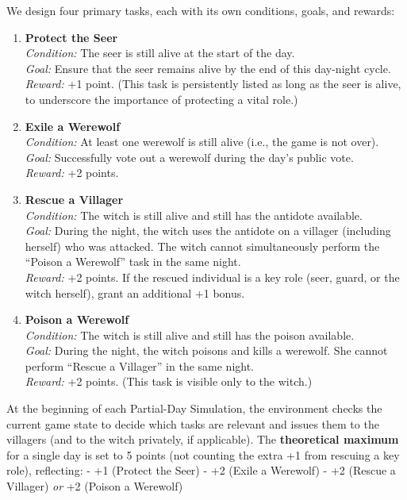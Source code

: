 We design four primary tasks, each with its own conditions, goals, and rewards:

\begin{enumerate}
    \item \textbf{Protect the Seer}\\
    \textit{Condition:} The seer is still alive at the start of the day.\\
    \textit{Goal:} Ensure that the seer remains alive by the end of this day-night cycle.\\
    \textit{Reward:} +1 point. (This task is persistently listed as long as the seer is alive, to underscore the importance of protecting a vital role.)

    \item \textbf{Exile a Werewolf}\\
    \textit{Condition:} At least one werewolf is still alive (i.e., the game is not over).\\
    \textit{Goal:} Successfully vote out a werewolf during the day’s public vote.\\
    \textit{Reward:} +2 points.

    \item \textbf{Rescue a Villager}\\
    \textit{Condition:} The witch is still alive and still has the antidote available.\\
    \textit{Goal:} During the night, the witch uses the antidote on a villager (including herself) who was attacked. The witch cannot simultaneously perform the “Poison a Werewolf” task in the same night.\\
    \textit{Reward:} +2 points. If the rescued individual is a key role (seer, guard, or the witch herself), grant an additional +1 bonus.

    \item \textbf{Poison a Werewolf}\\
    \textit{Condition:} The witch is still alive and still has the poison available.\\
    \textit{Goal:} During the night, the witch poisons and kills a werewolf. She cannot perform “Rescue a Villager” in the same night.\\
    \textit{Reward:} +2 points. (This task is visible only to the witch.)
\end{enumerate}

At the beginning of each Partial-Day Simulation, the environment checks the current game state to decide which tasks are relevant and issues them to the villagers (and to the witch privately, if applicable). The \textbf{theoretical maximum} for a single day is set to 5 points (not counting the extra +1 from rescuing a key role), reflecting:
- +1 (Protect the Seer)
- +2 (Exile a Werewolf)
- +2 (Rescue a Villager) \textit{or} +2 (Poison a Werewolf)

